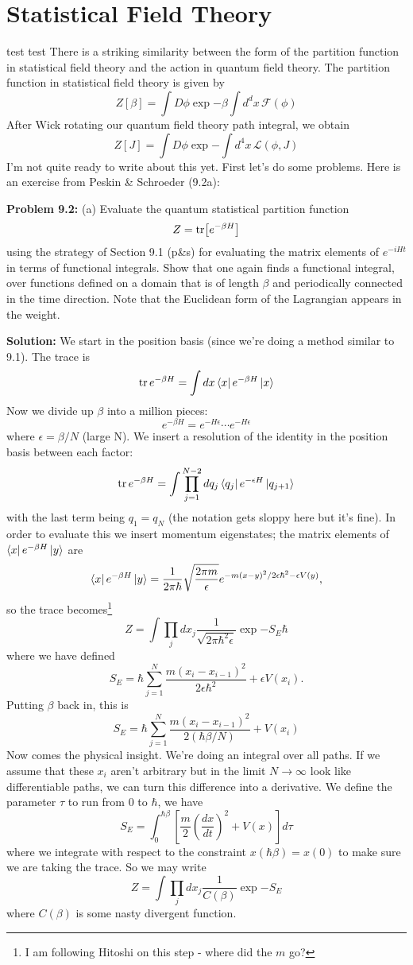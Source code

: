 \documentclass[main.tex]{subfiles}
\begin{document}
\chapter{Statistical Field Theory}
test test
There is a striking similarity between the form of the partition function in statistical field theory and the action in quantum field theory. The partition function in statistical field theory is given by
\[
Z[\beta] = \int D \phi \exp{- \beta \int d^d x \, \mathcal{F} (\phi)}
\]
After Wick rotating our quantum field theory path integral, we obtain
\[
Z[J] = \int D \phi \exp{-  \int d^4 x \, \mathcal{L} (\phi,J)}
\]
I'm not quite ready to write about this yet. First let's do some problems. Here is an exercise from Peskin {\&} Schroeder (9.2a):

\textbf{Problem 9.2:} \newline
(a) Evaluate the quantum statistical partition function
\[
Z = \tr [e^{-\beta H}]
\]
using the strategy of Section 9.1 (p{\&}s) for evaluating the matrix elements of $e^{-iHt}$ in terms of functional integrals. Show that one again finds a functional integral, over functions defined on a domain that is of length $\beta$ and periodically connected in the time direction. Note that the Euclidean form of the Lagrangian appears in the weight. 

\textbf{Solution:} \newline
We start in the position basis (since we're doing a method similar to 9.1). The trace is 
\[
\tr e^{-\beta H} = \int dx \bra{x} e^{-\beta H} \ket{x}
\]
Now we divide up $\beta$ into a million pieces:
\[
e^{-\beta H} = e^{-H\epsilon} \cdots e^{-H\epsilon}
\]
where $\epsilon = \beta/N$ (large N).
We insert a resolution of the identity in the position basis between each factor:
\[
\tr e^{-\beta H} = \int \prod_{j=1}^{N-2} dq_j \bra{q_j} e^{-\epsilon H} \ket{q_{j+1}}
\]
with the last term being $q_1 = q_N$ (the notation gets sloppy here but it's fine). In order to evaluate this we insert momentum eigenstates; the matrix elements of $\bra{x} e^{-\beta H} \ket{y}$ are 
\[
\bra{x} e^{-\beta H} \ket{y} = \frac{1}{2\pi \hbar} \sqrt{\frac{2\pi m}{\epsilon}} e^{-m(x-y)^2/2\epsilon \hbar^2 -\epsilon V(y)},
\]
so the trace becomes\footnote{I am following Hitoshi on this step - where did the $m$ go?}
\[
Z = \int \prod_j dx_j \frac{1}{\sqrt{2\pi \hbar^2 \epsilon}} \exp{-S_E\hbar}
\]
where we have defined
\[
S_E = \hbar \sum_{j=1}^N \frac{m(x_i - x_{i-1})^2}{2\epsilon \hbar^2} + \epsilon V(x_i).
\]
Putting $\beta$ back in, this is
\[
S_E = \hbar \sum_{j=1}^N \frac{m(x_i - x_{i-1})^2}{2(\hbar \beta/N)} + V(x_i)
\]
Now comes the physical insight. We're doing an integral over all paths. If we assume that these $x_i$ aren't arbitrary but in the limit $N\to \infty$ look like differentiable paths, we can turn this difference into a derivative. We define the parameter $\tau$ to run from $0$ to $\hbar$, we have
\[
S_E = \int_0^{\hbar \beta} \left[\frac{m}{2} \left( \frac{dx}{dt} \right)^2 + V(x) \right] d\tau
\]
where we integrate with respect to the constraint $x(\hbar \beta) = x(0)$ to make sure we are taking the trace. So we may write
\[
Z = \int \prod_j dx_j \frac{1}{C(\beta)} \exp{-S_E}
\]
where $C(\beta)$ is some nasty divergent function.
\end{document}
